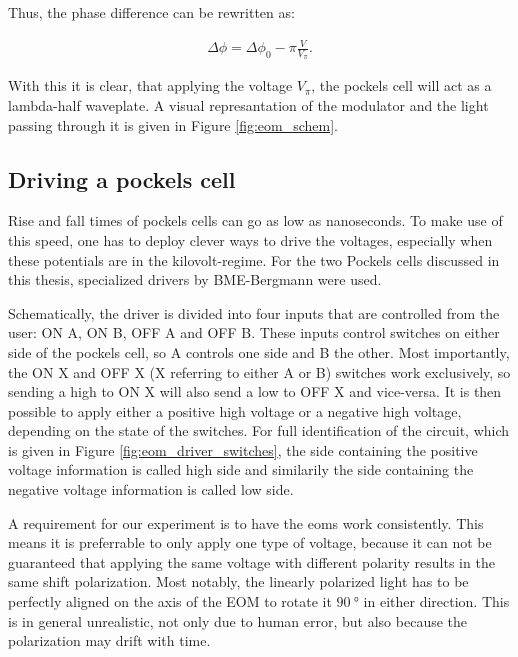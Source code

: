 Thus, the phase difference can be rewritten as:

\begin{align}
	\label{eq:eom_phase_diff}
	\Delta \phi = \Delta \phi_0 - \pi \frac{V}{V_\pi} .
\end{align}

With this it is clear, that applying the voltage $V_\pi$, the pockels cell will act as a lambda-half waveplate. A visual represantation of the modulator and the light passing through it is given in Figure \ref{fig:eom_schem}.

\subsection{Driving a pockels cell}

Rise and fall times of pockels cells can go as low as nanoseconds. To make use of this speed, one has to deploy clever ways to drive the voltages, especially when these potentials are in the kilovolt-regime. For the two Pockels cells discussed in this thesis, specialized drivers by BME-Bergmann  were used.

Schematically, the driver is divided into four inputs that are controlled from the user: ON A, ON B, OFF A and OFF B. These inputs control switches on either side of the pockels cell, so A controls one side and B the other. Most importantly, the ON X and OFF X (X referring to either A or B) switches work exclusively, so sending a high to ON X will also send a low to OFF X and vice-versa. It is then possible to apply either a positive high voltage or a negative high voltage, depending on the state of the switches. For full identification of the circuit, which is given in Figure \ref{fig:eom_driver_switches}, the side containing the positive voltage information is called high side and similarily the side containing the negative voltage information is called low side.

A requirement for our experiment is to have the \acp{eom} work consistently. This means it is preferrable to only apply one type of voltage, because it can not be guaranteed that applying the same voltage with different polarity results in the same shift polarization. Most notably, the linearly polarized light has to be perfectly aligned on the axis of the EOM to rotate it $\SI{90}{\degree}$ in either direction. This is in general unrealistic, not only due to human error, but also because the polarization may drift with time.

